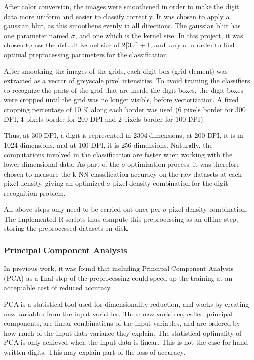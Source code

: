 After color conversion, the images were smoothened in order
to make the digit data more uniform and easier to classify correctly.
It was chosen to apply a gaussian blur, as this smoothens
evenly in all directions.
The gaussian blur has one parameter named \(\sigma\),
and one which is the kernel size.
In this project, it was chosen to use the default
kernel size of \(2 \lceil3\sigma\rceil +1\),
and vary \(\sigma\) in order to find
optimal preprocessing parameters for the classification.

After smoothing the images of the grids,
each digit box (grid element) was extracted
as a vector of greyscale pixel intensities.
To avoid training the classifiers to recognize the parts
of the grid that are inside the digit boxes,
the digit boxes were cropped until the grid was no longer visible,
before vectorization.
A fixed cropping percentage of 10 \% along each border was used
(6 pixels border for 300 DPI, 4 pixels border for 200 DPI and 2 pixels border for 100 DPI).

Thus, at 300 DPI, a digit is represented in 2304 dimensions,
at 200 DPI, it is in 1024 dimensions,
and at 100 DPI, it is 256 dimensions.
Naturally, the computations involved in the classification
are faster when working with the lower-dimensional data.
As part of the \(\sigma\) optimization process,
it was therefore chosen to measure the k-NN classification
accuracy on the raw datasets at each pixel density,
giving an optimized \(\sigma\)-pixel density combination
for the digit recognition problem.

All above steps only need to be carried out once per
\(\sigma\)-pixel density combination.
The implemented R scripts thus compute this preprocessing
as an offline step, storing the preprocessed
datasets on disk.

\subsubsection{Principal Component Analysis}
In previous work, it was found that including Principal Component Analysis (PCA)
as a final step of the preprocessing could speed up the training
at an acceptable cost of reduced accuracy.

PCA is a statistical tool used for dimensionality reduction,
and works by creating new variables from the input variables.
These new variables, called principal components,
are linear combinations of the input variables,
and are ordered by how much of the input data variance they explain.
The statistical optimality of PCA is only achieved
when the input data is linear. This is not the case
for hand written digits. This may explain part
of the loss of accuracy.

